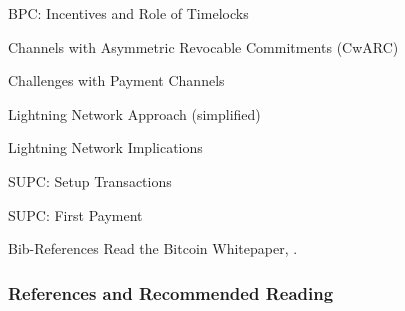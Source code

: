 \documentclass[]{beamer}
\begin{document}
\begin{frame}{BPC: Incentives and Role of Timelocks}


\end{frame}


\begin{frame}{Channels with Asymmetric Revocable Commitments (CwARC)}


\end{frame}


\begin{frame}{Challenges with Payment Channels}


\end{frame}

\begin{frame}{Lightning Network Approach (simplified)}


\end{frame}

\begin{frame}{Lightning Network Implications}


\end{frame}

\begin{frame}{SUPC: Setup Transactions}


\end{frame}

	
\begin{frame}{SUPC: First Payment}
	
\end{frame}

\begin{frame}{Bib-References}
		Read the Bitcoin Whitepaper, \cite{nakamotoBitcoin2008}.
\end{frame}

\begin{frame}%
\frametitle{References and Recommended Reading}
	
	
\end{frame}
\end{document}
